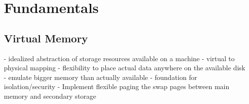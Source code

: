 \chapter{Fundamentals} %
\label{chap:fund}

%



\section{Virtual Memory}

- idealized abstraction of storage resources available on a machine
- virtual to physical mapping
- flexibility to place actual data anywhere on the available disk
- emulate bigger memory than actually available
- foundation for isolation/security
- Implement flexible paging the swap pages between main memory and secondary storage



